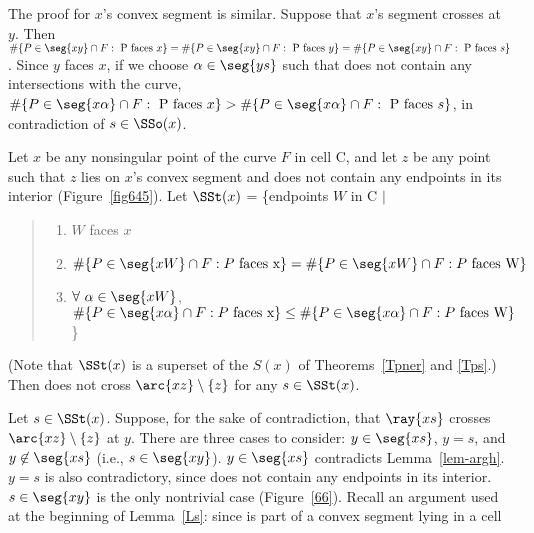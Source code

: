 
The proof for $x$'s convex segment is similar.
Suppose that $x$'s segment crosses  at $y$.
Then $\#\{P \in \seg{xy} \cap F: \mbox{ P faces $x$}\} = 
\#\{P \in \seg{xy} \cap F: \mbox{ P faces $y$}\} = 
\#\{P \in \seg{xy} \cap F: \mbox{ P faces $s$}\}$.
Since $y$ faces $x$, if we choose $\alpha \in \seg{ys}$ such that  
does not contain any intersections with the curve, 
$\#\{P \in \seg{x\alpha} \cap F: \mbox{ P faces $x$}\} 
> \#\{P \in \seg{x\alpha} \cap F: \mbox{ P faces $s$}\}$,
in contradiction of $s \in \SSo(x)$.
\QED

\begin{lemma}
\label{lem-645}
Let $x$ be any nonsingular point of the curve $F$ in cell C,
and let $z$ be any point such that $z$ lies on $x$'s convex segment
and  does not contain any endpoints in its interior (Figure~\ref{fig645}).
Let $\SSt(x)$ = \{endpoints $W$ in C $\mid$
\begin{quote}
\begin{enumerate}
\item $W$ faces $x$
\item \mbox{$\#\{P \in\seg{xW}\cap F: P \mbox{ faces x}\} =
\#\{P \in \seg{xW}\cap F: P \mbox{ faces W} \}$}
\item $\forall\ \alpha \in \seg{xW}$,
$\#\{P \in\seg{x\alpha}\cap F: P \mbox{ faces x}\} \leq
\#\{P \in \seg{x\alpha}\cap F: P \mbox{ faces W}\} $
\}
\end{enumerate}
\end{quote}
(Note that $\SSt(x)$ is a superset of the $S(x)$ of Theorems~\ref{Tpner} and \ref{Tps}.)
Then  does not cross $\arc{xz} \setminus \{z\}$ 
for any $s \in \SSt(x)$.
\end{lemma}
%
%
Let $s \in \SSt(x)$.
Suppose, for the sake of contradiction, that $\ray{xs}$ crosses 
$\arc{xz} \setminus \{z\}$ at $y$.
\label{thpr}
There are three cases to consider: $y \in \seg{xs}$, $y = s$, and $y \not\in \seg{xs}$
(i.e., $s \in \seg{xy}$).
$y \in \seg{xs}$ contradicts Lemma~\ref{lem-argh}.
$y = s$ is also contradictory, since  does not contain any endpoints in its 
interior.
$s \in \seg{xy}$ is the only nontrivial case (Figure~\ref{66}).
Recall an argument used at the beginning of Lemma~\ref{Ls}:
since  is part of a convex segment lying in a cell
